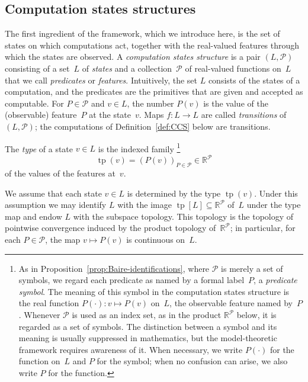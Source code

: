 \documentclass[psamsfonts]{amsart}
\theoremstyle{definition}
\theoremstyle{remark}
\DeclareMathOperator{\tp}{tp}
\numberwithin{equation}{section}
\begin{document}
\subsection{Computation states structures}
\label{sec:CSS}

The first ingredient of the framework, which we introduce here, is the set of states on which computations act, together with the real-valued features through which the states are observed.
A \emph{computation states structure} is a pair $(L,\mathcal{P})$ consisting of a set~$L$ of \emph{states} and a collection~$\mathcal{P}$ of real-valued functions on~$L$ that we call \emph{predicates} or \emph{features}.
Intuitively, the set $L$ consists of the states of a computation, and the predicates are the primitives that are given and accepted as computable.
For $P\in\mathcal{P}$ and $v\in L$, the number $P(v)$ is the value of the (observable) feature~$P$ at the state~$v$.
Maps $f\colon L\to L$ are called \emph{transitions} of $(L,\mathcal{P})$;
the computations of Definition~\ref{def:CCS} below are transitions.

The \emph{type} of a state $v\in L$ is the indexed family%
\footnote{As in Proposition~\ref{prop:Baire-identifications}, where $\mathcal{P}$ is merely a set of symbols, we regard each predicate as named by a formal label~$P$, a \emph{predicate symbol}.
  The meaning of this symbol in the computation states structure is the real function $P(\cdot)\colon v\mapsto P(v)$ on~$L$, the observable feature named by~$P$.
  Whenever $\mathcal{P}$ is used as an index set, as in the product $\mathbb{R}^{\mathcal{P}}$ below, it is regarded as a set of symbols.
  The distinction between a symbol and its meaning is usually suppressed in mathematics, but the model-theoretic framework requires awareness of it.
  When necessary, we write $P(\cdot)$ for the function on~$L$ and $P$ for the symbol;
  when no confusion can arise, we also write $P$ for the function.}
\[
  \operatorname{tp}(v)= (P(v))_{P\in \mathcal{P}}\in\mathbb{R}^\mathcal{P}
\]
of the values of the features at~$v$.

We assume that each state $v\in L$ is determined by the type $\operatorname{tp}(v)$.
Under this assumption we may identify $L$ with the image $\tp[L]\subseteq \mathbb{R}^{\mathcal{P}}$ of~$L$ under the type map and endow $L$ with the subspace topology.
This topology is the topology of pointwise convergence induced by the product topology of~$\mathbb{R}^\mathcal{P}$;
in particular, for each $P\in \mathcal{P}$, the map $v\mapsto P(v)$ is continuous on~$L$.
\end{document}
